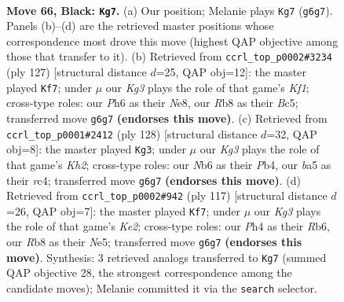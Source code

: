 \documentclass[11pt]{article}
\begin{document}
\clearpage

\begin{figure}[p]\centering
\begin{subfigure}{0.46\textwidth}\centering
\resizebox{\linewidth}{!}{%
\newchessgame
\chessboard[
  setfen={1r6/4b3/1n1p2kp/BB2p3/4P2p/5P2/5K2/7R b - - 2 66},
  showmover=false,
  pgfstyle=straightmove, color=movearrow, markmove={g6-g7}
]}
\caption{}
\end{subfigure}\hfill
\begin{subfigure}{0.46\textwidth}\centering
\resizebox{\linewidth}{!}{%
\newchessgame
\chessboard[
  setfen={4nk2/8/3p2p1/B1bP2P1/1p2P3/3B1K2/8/8 b - - 4 64},
  showmover=false,
  pgfstyle=straightmove, color=movearrow, markmove={f8-f7}
]}
\caption{}
\end{subfigure}
\\[4pt]
\begin{subfigure}{0.46\textwidth}\centering
\resizebox{\linewidth}{!}{%
\newchessgame
\chessboard[
  setfen={8/5k2/5p1B/1b2p2p/1Pr4P/5P2/1R4PK/8 w - - 16 65},
  showmover=false,
  pgfstyle=straightmove, color=movearrow, markmove={h2-g3}
]}
\caption{}
\end{subfigure}\hfill
\begin{subfigure}{0.46\textwidth}\centering
\resizebox{\linewidth}{!}{%
\newchessgame
\chessboard[
  setfen={6R1/4k3/1r2p1p1/4n2p/7P/6P1/2B2P2/5K2 b - - 48 59},
  showmover=false,
  pgfstyle=straightmove, color=movearrow, markmove={e7-f7}
]}
\caption{}
\end{subfigure}
\caption{\textbf{Move 66, Black: \texttt{Kg7}.} (a) Our position; Melanie plays \texttt{Kg7} (\texttt{g6g7}). Panels (b)--(d) are the retrieved master positions whose correspondence most drove this move (highest QAP objective among those that transfer to it). (b) Retrieved from \texttt{ccrl\_top\_p0002\#3234} (ply 127) [structural distance $d$=25, QAP obj=12]: the master played \texttt{Kf7}; under $\mu$ our \emph{Kg3} plays the role of that game's \emph{Kf1}; cross-type roles: our \emph{P}h6 as their \emph{N}e8, our \emph{R}b8 as their \emph{B}c5; transferred move \texttt{g6g7} \textbf{(endorses this move)}. (c) Retrieved from \texttt{ccrl\_top\_p0001\#2412} (ply 128) [structural distance $d$=32, QAP obj=8]: the master played \texttt{Kg3}; under $\mu$ our \emph{Kg3} plays the role of that game's \emph{Kh2}; cross-type roles: our \emph{N}b6 as their \emph{P}b4, our \emph{b}a5 as their \emph{r}c4; transferred move \texttt{g6g7} \textbf{(endorses this move)}. (d) Retrieved from \texttt{ccrl\_top\_p0002\#942} (ply 117) [structural distance $d$=26, QAP obj=7]: the master played \texttt{Kf7}; under $\mu$ our \emph{Kg3} plays the role of that game's \emph{Ke2}; cross-type roles: our \emph{P}h4 as their \emph{R}b6, our \emph{R}b8 as their \emph{N}e5; transferred move \texttt{g6g7} \textbf{(endorses this move)}. Synthesis: 3 retrieved analogs transferred to \texttt{Kg7} (summed QAP objective 28, the strongest correspondence among the candidate moves); Melanie committed it via the \texttt{search} selector.}
\label{fig:thought-m131}
\end{figure}
\end{document}
